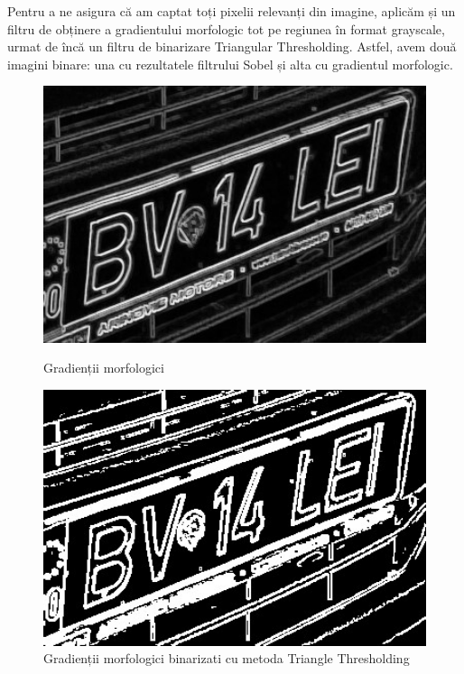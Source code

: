 \documentclass[a4paper,12pt]{report}
\begin{document}
Pentru a ne asigura că am captat toți pixelii relevanți din imagine, aplicăm și un filtru de obținere a gradientului morfologic tot pe regiunea în format grayscale, urmat de încă un filtru de binarizare Triangular Thresholding. Astfel, avem două imagini binare: una cu rezultatele filtrului Sobel și alta cu gradientul morfologic.

\begin{figure}[h]
    \centering
    \begin{minipage}{0.4\textwidth}
        \centering
        \includegraphics[width=1\textwidth]{images/gradient.jpg}
        \caption{Gradienții morfologici}
    \end{minipage}
    \hspace{0.05\textwidth}
    \begin{minipage}{0.4\textwidth}
        \centering
        \includegraphics[width=1\textwidth]{images/binary_gradient.jpg}
        \caption{Gradienții morfologici binarizati cu metoda Triangle Thresholding}
    \end{minipage}
\end{figure}
\FloatBarrier
\end{document}

